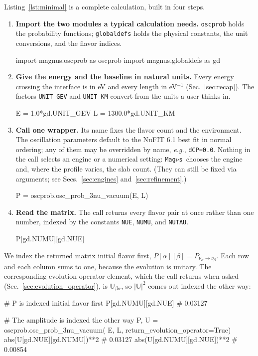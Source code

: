 \documentclass[final,5p,times,twocolumn,sort,compress]{elsarticle}
\makeatletter
\newcommand{\eg}{{\it e.g.}}
\DeclareRobustCommand{\_}{%
  \ifmmode\nfss@text{\textunderscore}\else\textunderscore\allowbreak\fi}
\newcommand{\magnus}{{\tt Mag}\ensuremath{\nu}{\tt s}}
\makeatother
\begin{document}
Listing~\ref{lst:minimal} is a complete calculation, built in four steps.
\begin{enumerate}
\item \textbf{Import the two modules a typical calculation needs.} {\tt oscprob} holds the probability functions; {\tt globaldefs} holds the physical constants, the unit conversions, and the flavor indices.
\begin{pysnip}
import magnus.oscprob as oscprob
import magnus.globaldefs as gd
\end{pysnip}
\item \textbf{Give the energy and the baseline in natural units.} Every energy crossing the interface is in eV and every length in eV$^{-1}$ (Sec.~\ref{sec:recap}). The factors {\tt UNIT\_GEV} and {\tt UNIT\_KM} convert from the units a user thinks in.
\begin{pysnip}
E = 1.0*gd.UNIT_GEV
L = 1300.0*gd.UNIT_KM
\end{pysnip}
\item \textbf{Call one wrapper.} Its name fixes the flavor count and the environment. The oscillation parameters default to the NuFIT 6.1 best fit in normal ordering; any of them may be overridden by name, \eg, {\tt dCP=0.0}. Nothing in the call selects an engine or a numerical setting: \magnus\ chooses the engine and, where the profile varies, the slab count. (They can still be fixed via arguments; see Secs.~\ref{sec:engines} and~\ref{sec:refinement}.)
\begin{pysnip}
P = oscprob.osc_prob_3nu_vacuum(E, L)
\end{pysnip}
\item \textbf{Read the matrix.} The call returns every flavor pair at once rather than one number, indexed by the constants {\tt NUE}, {\tt NUMU}, and {\tt NUTAU}.
\begin{pysnip}
P[gd.NUMU][gd.NUE]
\end{pysnip}
\end{enumerate}

We index the returned matrix initial flavor first, $P[\alpha][\beta] = P_{\nu_\alpha \to \nu_\beta}$. Each row and each column sums to one, because the evolution is unitary. The corresponding evolution operator element, which the call returns when asked (Sec.~\ref{sec:evolution_operator}), is $\mathbb{U}_{\beta\alpha}$, so $\lvert \mathbb{U}\rvert^2$ comes out indexed the other way:
\begin{pysnip}
# P is indexed initial flavor first
P[gd.NUMU][gd.NUE]           # 0.03127

# The amplitude is indexed the other way
P, U = oscprob.osc_prob_3nu_vacuum(
    E, L, return_evolution_operator=True)
abs(U[gd.NUE][gd.NUMU])**2   # 0.03127
abs(U[gd.NUMU][gd.NUE])**2   # 0.00854
\end{pysnip}
\end{document}
